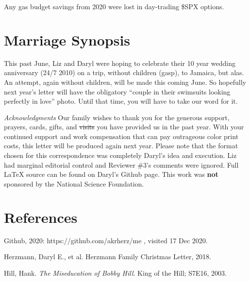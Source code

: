 \documentclass[letterpaper,11pt]{article}
\makeatletter
\def\refer{\par\noindent\hangindent\parindent\hangafter1}
\newenvironment{figurehere}
  {\def\@captype{figure}}
  {}
\makeatother
\begin{document}
\begin{multicols}{2}
\begin{figurehere}
    \centering   
    \caption{Any gas budget savings from 2020 were lost in day-trading \$SPX
    options.}
\end{figurehere}

\section{Marriage Synopsis}

This past June, Liz and Daryl were hoping
to celebrate their 10 year wedding anniversary (24/7 2010) on a trip,
without children (gasp), to Jamaica, but alas.  An attempt, again without
children, will be made this coming June.  So hopefully next year's letter will have the
obligatory \enquote{couple in their swimsuits looking perfectly in love} photo.
Until that time, you will have to take our word for it.

\bigskip

\emph{Acknowledgments} Our family wishes to thank you for the generous 
support, prayers, cards, gifts, and \sout{visits} you have provided us in the past
year. With your continued support and work compensation that can pay outrageous 
color print costs, this letter will be produced again
next year. Please note that the format chosen for this
correspondence was completely Daryl's idea and execution. Liz had marginal
editorial control and Reviewer \#3's comments were ignored. Full \LaTeX\xspace source can be found on Daryl's Github
page.  This work was \textbf{not} sponsored by the National Science Foundation.

\section{References}

\refer Github, 2020: https://github.com/akrherz/me , visited 17 Dec 2020.
\refer Herzmann, Daryl E., et al. Herzmann Family Christmas Letter, 2018.
\refer Hill, Hank. \textit{The Miseducation of Bobby Hill}. King of the Hill; S7E16, 2003.

\end{multicols}
\end{document}
